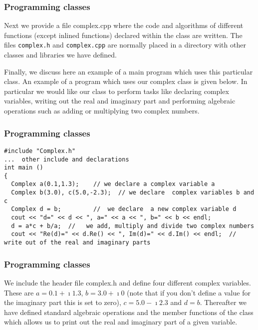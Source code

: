\documentclass{beamer}
\begin{document}
\begin{frame}
\frametitle{Programming classes}

Next we provide a file complex.cpp where the code and algorithms of
different functions (except inlined functions) declared within the
class are written.  The files \Verb!complex.h! and \Verb!complex.cpp! are normally
placed in a directory with other classes and libraries we have
defined.

Finally, we discuss here an example of a main program which uses this
particular class.  An example of a program which uses our complex
class is given below. In particular we would like our class to perform
tasks like declaring complex variables, writing out the real and
imaginary part and performing algebraic operations such as adding or
multiplying two complex numbers.
\end{frame}

\begin{frame}
\frametitle{Programming classes}

\begin{verbatim}
#include "Complex.h"
...  other include and declarations
int main ()
{
  Complex a(0.1,1.3);    // we declare a complex variable a
  Complex b(3.0), c(5.0,-2.3);  // we declare  complex variables b and c
  Complex d = b;         //  we declare  a new complex variable d
  cout << "d=" << d << ", a=" << a << ", b=" << b << endl;
  d = a*c + b/a;  //   we add, multiply and divide two complex numbers
  cout << "Re(d)=" << d.Re() << ", Im(d)=" << d.Im() << endl;  // write out of the real and imaginary parts

\end{verbatim}
\end{frame}

\begin{frame}
\frametitle{Programming classes}

We include the header file complex.h and define four different complex variables. These
are $a=0.1+\imath 1.3$, $b=3.0+\imath 0$ (note that if you don't define a value for the imaginary part  this is set to
zero), $c=5.0-\imath 2.3$ and $d=b$.  Thereafter we have defined standard algebraic operations and the member functions
of the class which allows us to print out the real and imaginary part of a given variable.
\end{frame}
\end{document}

